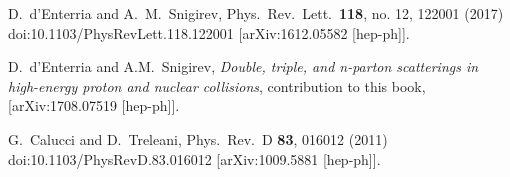 \documentclass{ws-rv9x6}
\begin{document}
\begin{thebibliography}{9}
  D.~d'Enterria and A.~M.~Snigirev,
  Phys.\ Rev.\ Lett.\  {\bf 118}, no. 12, 122001 (2017)
  doi:10.1103/PhysRevLett.118.122001
  [arXiv:1612.05582 [hep-ph]].


D.~d'Enterria and A.M.~Snigirev, 
{\it Double, triple, and n-parton scatterings in high-energy proton and nuclear collisions}, contribution to this book, [arXiv:1708.07519 [hep-ph]].


  G.~Calucci and D.~Treleani,
  Phys.\ Rev.\ D {\bf 83}, 016012 (2011)
  doi:10.1103/PhysRevD.83.016012
  [arXiv:1009.5881 [hep-ph]].


  
\end{thebibliography}
\end{document}
